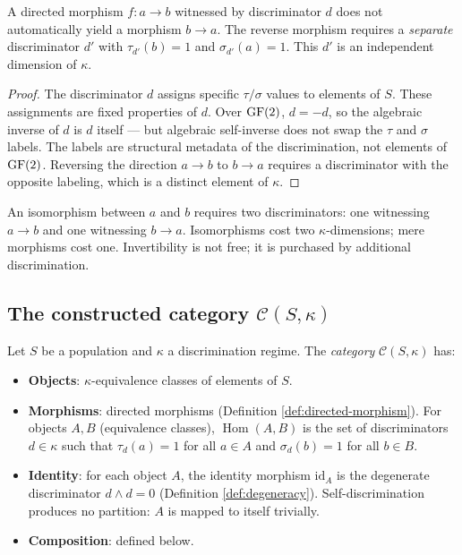 \begin{proposition}\label{prop:noninvert}
A directed morphism $f: a \to b$ witnessed by discriminator
$d$ does not automatically yield a morphism $b \to a$.
The reverse morphism requires a \emph{separate} discriminator
$d'$ with $\tau_{d'}(b) = 1$ and $\sigma_{d'}(a) = 1$.
This $d'$ is an independent dimension of $\kappa$.
\end{proposition}

\begin{proof}
The discriminator $d$ assigns specific $\tau/\sigma$ values
to elements of $S$. These assignments are fixed properties
of $d$. Over $\operatorname{GF}(2)$, $d = -d$, so the algebraic inverse
of $d$ is $d$ itself --- but algebraic self-inverse does not
swap the $\tau$ and $\sigma$ labels. The labels are structural
metadata of the discrimination, not elements of $\operatorname{GF}(2)$.
Reversing the direction $a \to b$ to $b \to a$ requires
a discriminator with the opposite labeling, which is a
distinct element of $\kappa$.
\end{proof}

\begin{corollary}\label{cor:iso-cost}
An isomorphism between $a$ and $b$ requires two discriminators:
one witnessing $a \to b$ and one witnessing $b \to a$.
Isomorphisms cost two $\kappa$-dimensions; mere morphisms
cost one. Invertibility is not free; it is purchased by
additional discrimination.
\end{corollary}

\subsection{The constructed category $\mathcal{C}(S,\kappa)$}

\begin{definition}\label{def:category}
Let $S$ be a population and $\kappa$ a discrimination regime.
The \emph{category} $\mathcal{C}(S,\kappa)$ has:
\begin{itemize}[nosep]
  \item \textbf{Objects}: $\kappa$-equivalence classes of
    elements of $S$.
  \item \textbf{Morphisms}: directed morphisms
    (Definition \ref{def:directed-morphism}). For objects
    $A, B$ (equivalence classes), $\operatorname{Hom}(A,B)$
    is the set of discriminators $d \in \kappa$ such that
    $\tau_d(a) = 1$ for all $a \in A$ and $\sigma_d(b) = 1$
    for all $b \in B$.
  \item \textbf{Identity}: for each object $A$, the identity
    morphism $\mathrm{id}_A$ is the degenerate discriminator
    $d \wedge d = 0$ (Definition \ref{def:degeneracy}).
    Self-discrimination produces no partition: $A$ is mapped
    to itself trivially.
  \item \textbf{Composition}: defined below.
\end{itemize}
\end{definition}

